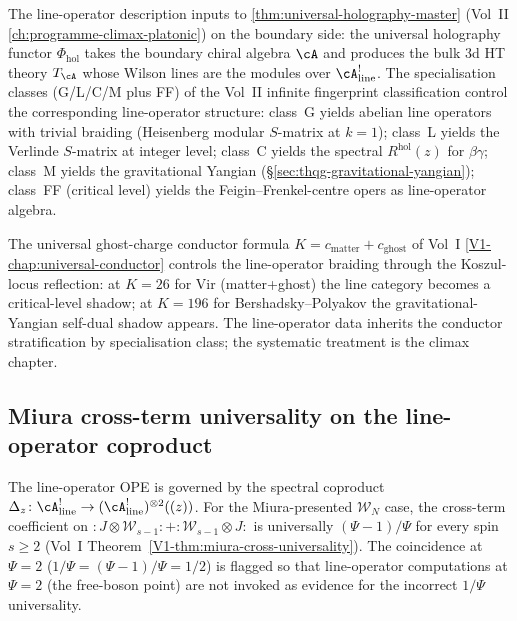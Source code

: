 \begin{remark}
\label{rem:line-operators-uhm-bridge}
The line-operator description inputs to
\cref{thm:universal-holography-master} (Vol~II
\cref{ch:programme-climax-platonic}) on the boundary side: the
universal holography functor $\Phi_{\mathrm{hol}}$ takes the boundary
chiral algebra $\cA$ and produces the bulk $3$d HT theory $T_\cA$
whose Wilson lines are the modules over $\cA^!_{\mathrm{line}}$.
The specialisation classes (G/L/C/M plus FF) of the Vol~II infinite
fingerprint classification control the corresponding line-operator
structure: class~G yields abelian line operators with trivial
braiding (Heisenberg modular $S$-matrix at $k=1$); class~L yields
the Verlinde $S$-matrix at integer level; class~C yields the
spectral $R^{\mathrm{hol}}(z)$ for $\beta\gamma$; class~M yields the
gravitational Yangian (\S\ref{sec:thqg-gravitational-yangian});
class~FF (critical level) yields the Feigin--Frenkel-centre opers
as line-operator algebra.
\end{remark}

\begin{remark}
\label{rem:line-operators-conductor-bridge}
The universal ghost-charge conductor formula
$K = c_{\mathrm{matter}} + c_{\mathrm{ghost}}$ of Vol~I
\cref{V1-chap:universal-conductor} controls the line-operator
braiding through the Koszul-locus reflection: at $K = 26$ for Vir
(matter+ghost) the line category becomes a critical-level shadow;
at $K = 196$ for Bershadsky--Polyakov the gravitational-Yangian
self-dual shadow appears. The line-operator data inherits the
conductor stratification by specialisation class; the systematic
treatment is the climax chapter.
\end{remark}

\subsection{Miura cross-term universality on the line-operator coproduct}
\label{subsec:line-operators-miura-coproduct}

\begin{remark}
\label{rem:line-operators-miura-coproduct}
The line-operator OPE is governed by the spectral coproduct
$\Delta_z\colon \cA^!_{\mathrm{line}}\to
(\cA^!_{\mathrm{line}})^{\otimes 2}((z))$. For the
Miura-presented $\mathcal{W}_N$ case, the cross-term coefficient on
$:J\otimes \mathcal{W}_{s-1}: + :\mathcal{W}_{s-1}\otimes J:$ is
universally $(\Psi-1)/\Psi$ for every spin $s\ge 2$ (Vol~I
Theorem~\ref*{V1-thm:miura-cross-universality}). The coincidence at
$\Psi=2$ ($1/\Psi = (\Psi-1)/\Psi = 1/2$) is flagged so that
line-operator computations at $\Psi=2$ (the free-boson point) are
not invoked as evidence for the incorrect $1/\Psi$ universality.
\end{remark}

